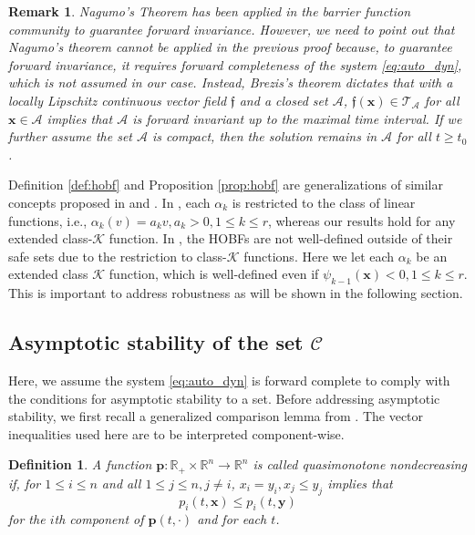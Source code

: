 \documentclass[letterpaper, 10 pt, journal, twoside]{IEEEtran}
\theoremstyle{plain}
\newtheorem{definition}{Definition}
\newtheorem{remark}{Remark}
\newcommand{\myvar}[1]{\bm{#1}}
\newcommand{\myset}[1]{\mathscr{#1}}
\begin{document}
\begin{remark}
 Nagumo's Theorem \cite[Theorem~4.7]{Blanchini2015} has been applied in the barrier function community to {guarantee} forward invariance. However, we need to point out that Nagumo's theorem cannot be applied in the previous proof because, to guarantee  forward invariance, it requires forward completeness of the system \eqref{eq:auto_dyn}, which is not assumed in our case. Instead,  Brezis's theorem {dictates} that with a locally Lipschitz continuous vector field $\mathfrak{f}$ and a closed set $\myset{A} $,  $ \mathfrak{f} (\myvar{x})\in \mathcal{T}_{\myset{A}}$ for all $\myvar{x} \in \myset{A}$ implies that $\myset{A} $ is forward invariant up to the maximal time interval. If we further assume the set $\myset{A}$ {is} compact, {then} the solution remains in $\myset{A}$ for all $t\ge t_0$.

\end{remark}

Definition \ref{def:hobf} and Proposition \ref{prop:hobf} are {generalizations} of similar concepts proposed in \cite{xu2018constrained} and \cite{xiao2019control}. In \cite{xu2018constrained}, each $ \alpha_{k} $ is restricted to the class of linear functions, i.e., $ \alpha_{k}(v)= a_k v, a_k >0, 1\le k \le r $, {whereas our results hold for any extended class-$\mathcal{K}$ function}. {In} \cite{xiao2019control}, {the HOBFs are not well-defined outside of their safe sets due to the restriction to class-$\mathcal{K}$ functions. Here} we let each $ \alpha_{k} $ be an extended class $\mathcal{K}$ function, which is well-defined even if $\psi_{k-1}(\myvar{x}) <0, 1\le k \le r$. {This is important to address robustness as will be shown in the following section.}

\subsection{ Asymptotic stability of the set $\myset{C}$}
Here, we assume {the} system \eqref{eq:auto_dyn} is forward complete to comply with the conditions for asymptotic stability to a set. Before addressing asymptotic stability, we first recall a generalized comparison lemma from \cite{lakshmikantham1989stability}. The {vector} inequalities {used here} are {to be} interpreted component-wise.


\begin{definition}
	A function $ \myvar{p}: \mathbb{R}_{+}  \times \mathbb{R}^n \to \mathbb{R}^n $ is called \textit{quasimonotone nondecreasing} if,  for $ 1 \leq i \leq n$ and all $ 1 \leq j \leq n,  j\neq i $, $x_i = y_i, x_j \le y_j $  implies that
	\begin{equation}
	   p_i(t, \myvar{x}) \le p_i(t, \myvar{y}) 
	\end{equation}
	for the $ i $th component of $ \myvar{p} (t,\cdot)$ and for each $ t $.  

\end{definition}
\end{document}
